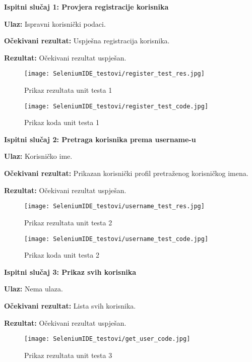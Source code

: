 \textbf{Ispitni slučaj 1: Provjera registracije korisnika}

	\noindent\textbf{Ulaz:}
		Ispravni korisnički podaci.

	\noindent\textbf{Očekivani rezultat:}
		Uspješna registracija korisnika.

	\noindent\textbf{Rezultat:}
		Očekivani rezultat uspješan.
	
				\begin{figure}[H]
					\texttt{[image: SeleniumIDE\_testovi/register\_test\_res.jpg]}
					\centering
					\caption{Prikaz rezultata unit testa 1}
					\label{fig:rez_test1}
				\end{figure}
				
				\begin{figure}[H]
					\texttt{[image: SeleniumIDE\_testovi/register\_test\_code.jpg]}
					\centering
					\caption{Prikaz koda unit testa 1}
					\label{fig:kod_test1}
				\end{figure}

\noindent\textbf{Ispitni slučaj 2: Pretraga korisnika prema username-u}

	\noindent\textbf{Ulaz:}
		Korisničko ime.

	\noindent\textbf{Očekivani rezultat:}
		Prikazan korisnički profil pretraženog korisničkog imena.

	\noindent\textbf{Rezultat:}
		Očekivani rezultat uspješan.
	
				\begin{figure}[H]
					\texttt{[image: SeleniumIDE\_testovi/username\_test\_res.jpg]}
					\centering
					\caption{Prikaz rezultata unit testa 2}
					\label{fig:rez_test2}
				\end{figure}
				
				\begin{figure}[H]
					\texttt{[image: SeleniumIDE\_testovi/username\_test\_code.jpg]}
					\centering
					\caption{Prikaz koda unit testa 2}
					\label{fig:kod_test2}
				\end{figure}

\noindent\textbf{Ispitni slučaj 3: Prikaz svih korisnika}

	\noindent\textbf{Ulaz:}
		Nema ulaza.
		
	\noindent\textbf{Očekivani rezultat:}
		Lista svih korisnika.
		
	\noindent\textbf{Rezultat:}
		Očekivani rezultat uspješan.
	
				\begin{figure}[H]
					\texttt{[image: SeleniumIDE\_testovi/get\_user\_code.jpg]}
					\centering
					\caption{Prikaz rezultata unit testa 3}
					\label{fig:rez_test3}
				\end{figure}
				
